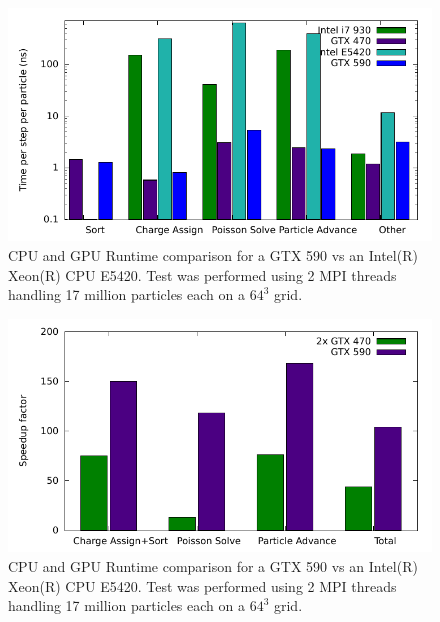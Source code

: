 \noindent \begin{figure}
\begin{center}
\includegraphics[width=6in]{performance/architecture_compare.pdf}
\end{center}
\caption{CPU and GPU Runtime comparison for a GTX 590 vs an Intel(R) Xeon(R) CPU E5420. Test was performed using 2 MPI threads handling 17 million particles each on a $64^3$ grid.}
\label{fig:speedup} 
\end{figure} 

\noindent \begin{figure}
\begin{center}
\includegraphics[width=6in]{performance/architecture_speedup_compare.pdf}
\end{center}
\caption{CPU and GPU Runtime comparison for a GTX 590 vs an Intel(R) Xeon(R) CPU E5420. Test was performed using 2 MPI threads handling 17 million particles each on a $64^3$ grid.}
\label{fig:speedup2} 
\end{figure} 



